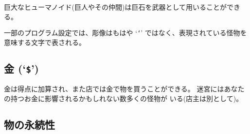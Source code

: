巨大なヒューマノイド(巨人やその仲間)は巨石を武器として用いることができる。

一部のプログラム設定では、彫像はもはや
`{\tt `}'
ではなく、表現されている怪物を意味する文字で表される。

\subsection*{金 (`{\tt \$}')}

金は得点に加算され、また店では金で物を買うことができる。
迷宮にはあなたの持つお金に影響されるかもしれない数多くの怪物が
いる(店主は別として)。

\subsection*{物の永続性}

